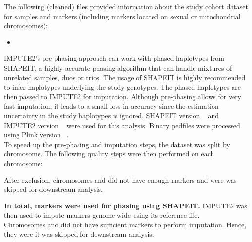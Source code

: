 
The following (cleaned) files provided information about the study cohort
dataset for  samples and 
markers (including  markers located on sexual or
mitochondrial chromosomes):

\begin{itemize}
  \item {}
\end{itemize}

IMPUTE2's pre-phasing approach can work with phased haplotypes from SHAPEIT, a
highly accurate phasing algorithm that can handle mixtures of unrelated
samples, duos or trios. The usage of SHAPEIT is highly recommended to infer
haplotypes underlying the study genotypes. The phased haplotypes are then
passed to IMPUTE2 for imputation. Although pre-phasing allows for very fast
imputation, it leads to a small loss in accuracy since the estimation
uncertainty in the study haplotypes is ignored. SHAPEIT version
~\cite{Delaneau13_23269371} and IMPUTE2 version
~\cite{Howie09_19543373,Howie11_22384356,Howie12_22820512}
were used for this analysis. Binary pedfiles were processed using Plink version
~\cite{Purcell07_17701901}.\\

To speed up the pre-phasing and imputation steps, the dataset was split by
chromosome. The following quality steps were then performed on each chromosome:


After exclusion, chromosomes
 and  did not have enough markers and
were was 
skipped for downstream analysis.\\

\textbf{In total,  markers were used for phasing
using SHAPEIT.} IMPUTE2 was then used to impute markers genome-wide using its
reference file.\\

Chromosomes
 and  did not have sufficient
markers to perform imputation. Hence,
they were it was 
skipped for downstream analysis.\\

